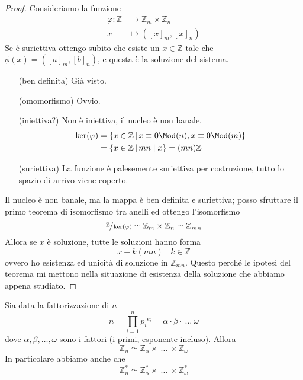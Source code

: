 \begin{proof}
	Consideriamo la funzione 
	\begin{align*}
	\varphi:\mathbb{Z}&\longrightarrow\mathbb{Z}_m\times\mathbb{Z}_n\\
	x&\longmapsto\left([x]_m,[x]_n\right)
	\end{align*}
	Se è suriettiva ottengo subito che esiste un $x\in\mathbb{Z}$ tale che $\phi(x)=\left([a]_m,[b]_n\right)$, e questa è la soluzione del sistema.
	\begin{itemize}
		\item[(ben definita)] Già visto.
		\item[(omomorfismo)] Ovvio.
		\item[(iniettiva?)] Non è iniettiva, il nucleo è non banale.
		\begin{align*}
		\ker(\varphi)&=\left\{x\in\mathbb{Z} \, \middle| \, x\equiv 0 \Mod(n),x \equiv 0 \Mod(m)\right\}\\
		&=\left\{x\in\mathbb{Z} \, \middle| \, mn
		\mid x\right\}=(mn)\mathbb{Z}
		\end{align*}
		\item[(suriettiva)]
		La funzione è palesemente suriettiva per costruzione, tutto lo spazio di arrivo viene coperto.
	\end{itemize}
	Il nucleo è non banale, ma la mappa è ben definita e suriettiva; posso sfruttare il primo teorema di isomorfismo tra anelli ed ottengo l'isomorfismo
	\begin{equation*}
	\sfrac{\mathbb{Z}}{\ker(\varphi)}\simeq\mathbb{Z}_m\times\mathbb{Z}_n\simeq\mathbb{Z}_{mn}
	\end{equation*}
	Allora se $x$ è soluzione, tutte le soluzioni hanno forma 
	\begin{equation*}
	x+k(mn) \ \ \ \ k\in\mathbb{Z}
	\end{equation*}
	ovvero ho esistenza ed unicità di soluzione in $\mathbb{Z}_{mn}$. Questo perché le ipotesi del teorema mi mettono nella situazione di esistenza della soluzione che abbiamo appena studiato.
\end{proof}
\begin{proposizione}
	Sia data la fattorizzazione di $n$
	\begin{equation*}
	n=\prod_{i=1}^{n}{p_i}^{\displaystyle{e_i}}=\alpha\cdot\beta\cdot\ \dots \ \omega
	\end{equation*}
	dove $\alpha,\beta,\dots,\omega$ sono i fattori (i primi, esponente incluso). Allora 
	\begin{equation*}
	\mathbb{Z}_n\simeq\mathbb{Z}_{\alpha}\times\ \dots \ \times\mathbb{Z}_{\omega}
	\end{equation*}
	In particolare abbiamo anche che 
	\begin{equation*}
	\mathbb{Z}_n^*\simeq\mathbb{Z}_{\alpha}^*\times\ \dots \ \times\mathbb{Z}_{\omega}^*
	\end{equation*}
\end{proposizione}
